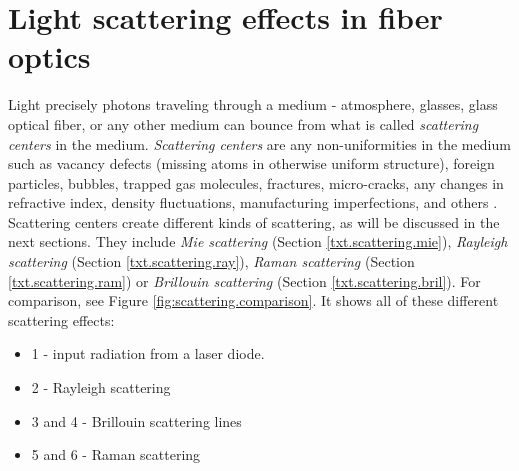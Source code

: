 




\section{Light scattering effects in fiber optics}\label{txt.scattering}

Light precisely photons traveling through a medium - atmosphere, glasses, glass optical fiber, or any other medium can bounce from what is called \textit{scattering centers} in the medium. \textit{Scattering centers} are any non-uniformities in the medium such as vacancy defects (missing atoms in otherwise uniform structure), foreign particles, bubbles, trapped gas molecules, fractures, micro-cracks, any changes in refractive index, density fluctuations, manufacturing imperfections, and others \cite{scatteringcenterbook}. Scattering centers create different kinds of scattering, as will be discussed in the next sections. They include \textit{Mie scattering} (Section \ref{txt.scattering.mie}), \textit{Rayleigh scattering} (Section \ref{txt.scattering.ray}), \textit{Raman scattering} (Section \ref{txt.scattering.ram}) or \textit{Brillouin scattering} (Section \ref{txt.scattering.bril}). For comparison, see Figure \ref{fig:scattering.comparison}. It shows all of these different scattering effects:

\begin{itemize}
    \item 1 - input radiation from a laser diode.
    \item 2 - Rayleigh scattering 
    \item 3 and 4 - Brillouin scattering lines %
    \item 5 and 6 - Raman scattering 
\end{itemize}


